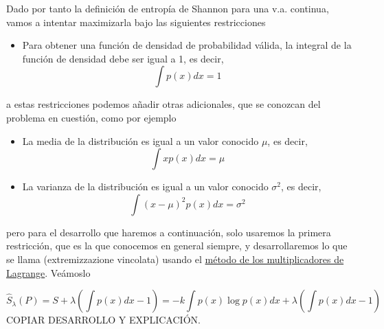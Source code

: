 \noindent
Dado por tanto la definición de entropía de Shannon para una v.a. continua, vamos a intentar maximizarla bajo las siguientes restricciones
\begin{itemize}
    \item Para obtener una función de densidad de probabilidad válida, la integral de la función de densidad debe ser igual a 1, es decir,
    \begin{equation*}
        \int p(x) dx = 1
    \end{equation*}
\end{itemize}
a estas restricciones podemos añadir otras adicionales, que se conozcan del problema en cuestión, como por ejemplo
\begin{itemize}
    \item La media de la distribución es igual a un valor conocido $\mu$, es decir,
    \begin{equation*}
        \int x p(x) dx = \mu
    \end{equation*}
    \item La varianza de la distribución es igual a un valor conocido $\sigma^2$, es decir,
    \begin{equation*}
        \int (x - \mu)^2 p(x) dx = \sigma^2
    \end{equation*}
\end{itemize}
pero para el desarrollo que haremos a continuación, solo usaremos la primera restricción, que es la que conocemos en general siempre, y desarrollaremos lo que se llama  (extremizzazione vincolata) usando el \underline{método de los multiplicadores de Lagrange}. Veámoslo

\begin{equation*}
    \widehat{S}_{\lambda}(P) = S+\lambda\left( \int p(x) dx -1 \right)= -k \int p(x) \log p(x) dx + \lambda \left( \int p(x) dx -1 \right)
\end{equation*}
COPIAR DESARROLLO Y EXPLICACIÓN. \\


